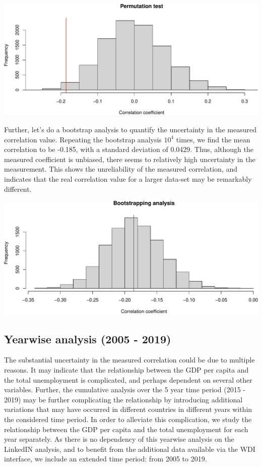 \documentclass[
]{article}
\begin{document}
\includegraphics{main_files/figure-latex/permutation_plot-1.pdf}

Further, let's do a bootstrap analysis to quantify the uncertainty in
the measured correlation value. Repeating the bootstrap analysis
\ensuremath{10^{4}} times, we find the mean correlation to be -0.185,
with a standard deviation of 0.0429. Thus, although the measured
coefficient is unbiased, there seems to relatively high uncertainty in
the measurement. This shows the unreliability of the measured
correlation, and indicates that the real correlation value for a larger
data-set may be remarkably different.

\includegraphics{main_files/figure-latex/unnamed-chunk-8-1.pdf}

\hypertarget{yearwise-analysis-2005---2019}{%
\subsection{Yearwise analysis (2005 -
2019)}\label{yearwise-analysis-2005---2019}}

The substantial uncertainty in the measured correlation could be due to
multiple reasons. It may indicate that the relationship between the GDP
per capita and the total unemployment is complicated, and perhaps
dependent on several other variables. Further, the cumulative analysis
over the 5 year time period (2015 - 2019) may be further complicating
the relationship by introducing additional variations that may have
occurred in different countries in different years within the considered
time period. In order to alleviate this complication, we study the
relationship between the GDP per capita and the total unemployment for
each year separately. As there is no dependency of this yearwise
analysis on the LinkedIN analysis, and to benefit from the additional
data available via the WDI interface, we include an extended time
period: from 2005 to 2019.
\end{document}
